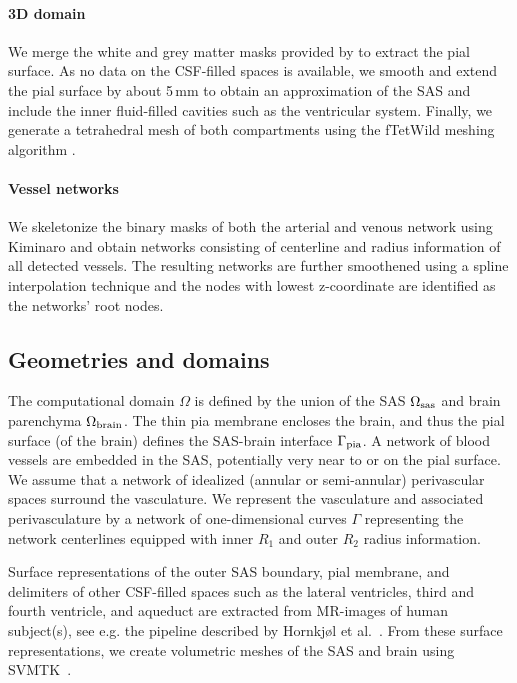 \documentclass[fleqn,10pt]{wlscirep}
\begin{document}
\paragraph{3D domain}

We merge the white and grey matter masks provided by \cite{hodneland2019new} to extract the pial surface. As no data on the CSF-filled spaces is available, we smooth and extend the pial surface by about 5\,mm to obtain an approximation of the SAS and include the inner fluid-filled cavities such as the ventricular system. 
Finally, we generate a tetrahedral mesh of both compartments using the fTetWild meshing algorithm \cite{hu2020fast}.

\paragraph{Vessel networks}

We skeletonize the binary masks of both the arterial and venous network using Kiminaro \cite{william_silversmith_2021_5539913} and obtain networks consisting of centerline and radius information of all detected vessels. The resulting networks are further smoothened using a spline interpolation technique and the nodes with lowest z-coordinate are identified as the networks' root nodes.

\subsection*{Geometries and domains}

The computational domain $\Omega$ is defined by the union of the SAS $\Omega_{\rm sas}$ and brain parenchyma $\Omega_{\rm brain}$. The thin pia membrane encloses the brain, and thus the pial surface (of the brain) defines the SAS-brain interface $\Gamma_{\rm pia}$. A network of blood vessels are embedded in the SAS, potentially very near to or on the pial surface. We assume that a network of idealized (annular or semi-annular) perivascular spaces surround the vasculature. We represent the vasculature and associated perivasculature by a network of one-dimensional curves $\Gamma$ representing the network centerlines equipped with inner $R_1$ and outer $R_2$ radius information. 

Surface representations of the outer SAS boundary, pial membrane, and delimiters of other CSF-filled spaces such as the lateral ventricles, third and fourth ventricle, and aqueduct are extracted from MR-images of human subject(s), see e.g. the pipeline described by Hornkjøl et al.~\cite{hornkjol2022csf}. From these surface representations, we create volumetric meshes of the SAS and brain using SVMTK~\cite{mardal2022mathematical}. 
\end{document}
